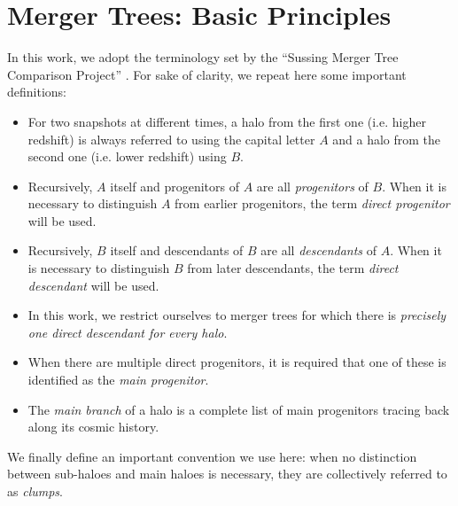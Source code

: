 \chapter{Merger Trees: Basic Principles}\label{chap:making_trees}

In this work, we adopt the terminology set by the ``Sussing Merger
Tree Comparison Project'' \citep{SUSSING_COMPARISON,
  SUSSING_CONVERGENCE, SUSSING_HALOFINDER,leeSussingMergerTrees2014}.
For sake of clarity, we repeat here some important definitions:

\begin{itemize}

\item For two snapshots at different times, a halo from the first one
  (i.e. higher redshift) is always referred to using the capital
  letter $A$ and a halo from the second one (i.e. lower redshift)
  using $B$.

\item Recursively, $A$ itself and progenitors of $A$ are all
  \emph{progenitors} of $B$.  When it is necessary to distinguish $A$
  from earlier progenitors, the term \emph{direct progenitor} will be
  used.

\item Recursively, $B$ itself and descendants of $B$ are all
  \emph{descendants} of $A$.  When it is necessary to distinguish $B$
  from later descendants, the term \emph{direct descendant} will be
  used.

\item In this work, we restrict ourselves to merger trees for which
  there is \emph{precisely one direct descendant for every halo}.

\item When there are multiple direct progenitors, it is required that
  one of these is identified as the \emph{main progenitor}.

\item The \emph{main branch} of a halo is a complete list of main
  progenitors tracing back along its cosmic history.

\end{itemize}
We finally define an important convention we use here: when no
distinction between sub-haloes and main haloes is necessary, they are
collectively referred to as \emph{clumps}.






